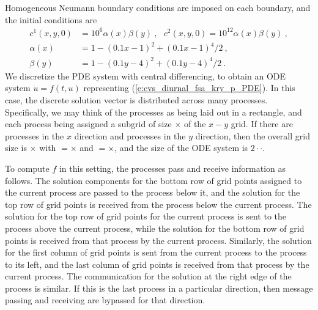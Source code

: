 Homogeneous Neumann boundary conditions are imposed on each boundary, and the
initial conditions are 
\begin{equation} \label{e:cvs_diurnal_fsa_kry_p_IC}
  \begin{split}
  c^{1}(x,y,0) &= 10^{6}\alpha (x)\beta (y) ~,~~~ 
                    c^{2}(x,y,0)=10^{12}\alpha(x)\beta (y) ~, \\
  \alpha (x) &= 1-(0.1x-1)^{2}+(0.1x-1)^{4}/2 ~, \\
  \beta (y) &= 1-(0.1y-4)^{2}+(0.1y-4)^{4}/2 ~.
  \end{split} 
\end{equation}
We discretize the PDE system with central differencing, to
obtain an ODE system ${\dot u} = f(t,u)$ representing (\ref{e:cvs_diurnal_fsa_kry_p_PDE}).  
In this case, the discrete solution vector is distributed across
many processes.  Specifically, we may think of the processes as
being laid out in a rectangle, and each process being assigned a
subgrid of size $\times$ of the $x-y$ grid. If
there are  processes in the $x$ direction and 
processes in the $y$ direction, then the overall grid size is
$\times$ with $=$$\times$ and
$=$$\times$, and the size of the ODE system is
$2\cdot$$\cdot$.  

To compute $f$ in this setting, the processes pass and receive
information as follows.  The solution components for the bottom row of
grid points assigned to the current process are passed to the process below
it, and the solution for the top row of grid points is received from
the process below the current process. The solution for the top
row of grid points for the current process is sent to the process
above the current process, while the solution for the bottom row of
grid points is received from that process by the current
process. Similarly, the solution for the first column of grid points
is sent from the current process to the process to its left, and
the last column of grid points is received from that process by the
current process. The communication for the solution at the right
edge of the process is similar. If this is the last process in a
particular direction, then message passing and receiving are bypassed
for that direction.

